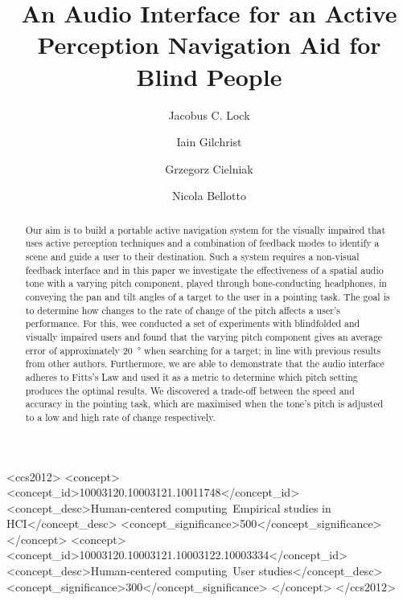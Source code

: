 \documentclass[sigconf, screen=true, anonymous=true]{acmart}
\begin{document}
\title{An Audio Interface for an Active Perception Navigation Aid for Blind People}

\author{Jacobus C. Lock}

\author{Iain Gilchrist}

\author{Grzegorz Cielniak}

\author{Nicola Bellotto}

\begin{abstract}
	Our aim is to build a portable active navigation system for the visually impaired that uses active perception techniques and a combination of feedback modes to identify a scene and guide a user to their destination.
	Such a system requires a non-visual feedback interface and in this paper we investigate the effectiveness of a spatial audio tone with a varying pitch component, played through bone-conducting headphones, in conveying the pan and tilt angles of a target to the user in a pointing task.
	The goal is to determine how changes to the rate of change of the pitch affects a user's performance.
	For this, wee conducted a set of experiments with blindfolded and visually impaired users and found that the varying pitch component gives an average error of approximately \SI{20}{\degree} when searching for a target; in line with previous results from other authors.
	Furthermore, we are able to demonstrate that the audio interface adheres to Fitts's Law and used it as a metric to determine which pitch setting produces the optimal results.
	We discovered a trade-off between the speed and accuracy in the pointing task, which are maximised when the tone's pitch is adjusted to a low and high rate of change respectively. 
\end{abstract}

 \begin{CCSXML}
<ccs2012>
<concept>
<concept_id>10003120.10003121.10011748</concept_id>
<concept_desc>Human-centered computing~Empirical studies in HCI</concept_desc>
<concept_significance>500</concept_significance>
</concept>
<concept>
<concept_id>10003120.10003121.10003122.10003334</concept_id>
<concept_desc>Human-centered computing~User studies</concept_desc>
<concept_significance>300</concept_significance>
</concept>
</ccs2012>
\end{CCSXML}
\end{document}
